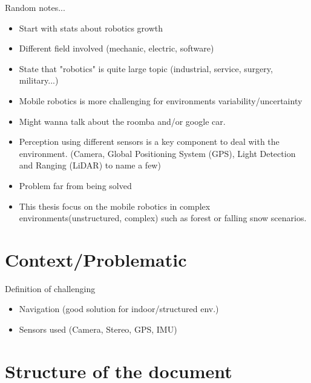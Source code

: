 Random notes...
\begin{itemize}
    \item Start with stats about robotics growth
    \item Different field involved (mechanic, electric, software)
    \item State that "robotics" is quite large topic (industrial, service, surgery, military...)
    \item Mobile robotics is more challenging for environments variability/uncertainty
    \item Might wanna talk about the roomba and/or google car.
    \item Perception using different sensors is a key component to deal with the environment. (Camera, Global Positioning System (GPS), Light Detection and Ranging (LiDAR) to name a few)
    \item Problem far from being solved
    \item This thesis focus on the mobile robotics in complex environments(unstructured, complex) such as forest or falling snow scenarios.
\end{itemize}

\section{Context/Problematic}
\label{sec:chap1_context}
Definition of challenging
\begin{itemize}
    \item Navigation (good solution for indoor/structured env.)
    \item Sensors used (Camera, Stereo, GPS, IMU)
\end{itemize}

\section{Structure of the document}
\label{sec:structure_of_the_document}

